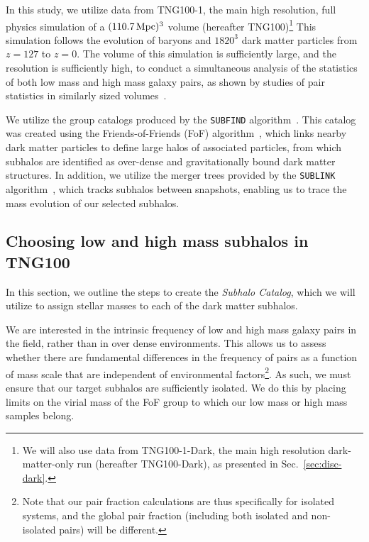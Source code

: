 \documentclass[twocolumn]{aastex631}
\newcommand{\subcat}{\textit{Subhalo Catalog}}
\begin{document}
    In this study, we utilize data from TNG100-1, the main high resolution, full physics simulation of a $(110.7\,\mathrm{Mpc})^3$ volume (hereafter TNG100)\footnote{We will also use data from TNG100-1-Dark, the main high resolution dark-matter-only run (hereafter TNG100-Dark), as presented in Sec.~\ref{sec:disc-dark}.} 
    This simulation follows the evolution of baryons and $1820^3$ dark matter particles from $z=127$ to $z=0$.  
    The volume of this simulation is sufficiently large, and the resolution is sufficiently high, to conduct a simultaneous analysis of the statistics of both low mass and high mass galaxy pairs, as shown by studies of pair statistics in similarly sized volumes~\citep{Sales2013,Patel2017a-Orbits,Patel2017b-Masses,Besla2018}. 

    We utilize the group catalogs produced by the \texttt{SUBFIND} algorithm~\citep{Springel2001,Dolag2009}. 
    This catalog was created using the Friends-of-Friends (FoF) algorithm~\citep{Davis1985}, which links nearby dark matter particles to define large halos of associated particles, from which subhalos are identified as over-dense and gravitationally bound dark matter structures.
    In addition, we utilize the merger trees provided by the \texttt{SUBLINK} algorithm~\citep{RG2015}, which tracks subhalos between snapshots, enabling us to trace the mass evolution of our selected subhalos. 


    \subsection{Choosing low and high mass subhalos in TNG100} \label{sec:methods-halos}

    In this section, we outline the steps to create the \subcat, which we will utilize to assign stellar masses to each of the dark matter subhalos. 


    We are interested in the intrinsic frequency of low and high mass galaxy pairs in the field, rather than in over dense environments. 
    This allows us to assess whether there are fundamental differences in the frequency of pairs as a function of mass scale that are independent of environmental factors\footnote{Note that our pair fraction calculations are thus specifically for isolated systems, and the global pair fraction (including both isolated and non-isolated pairs) will be different.}.
    As such, we must ensure that our target subhalos are sufficiently isolated.  
    We do this by placing limits on the virial mass of the FoF group to which our low mass or high mass samples belong.   
    
\end{document}
